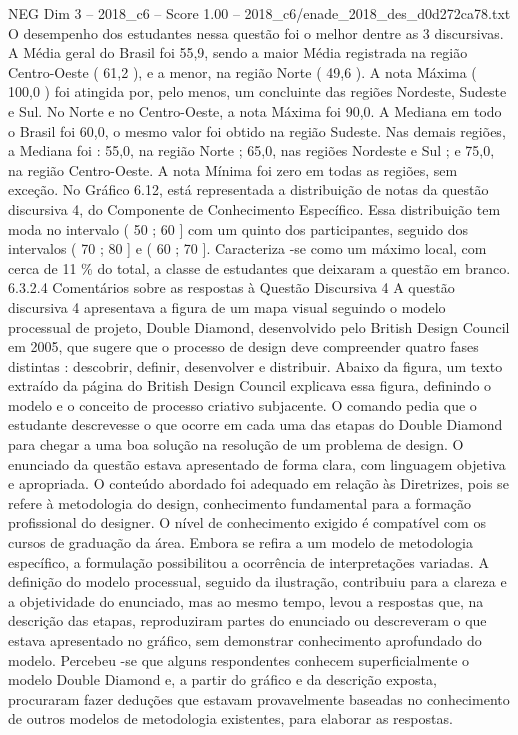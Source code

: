\begin{textsample}{NEG Dim 3 – 2018\_c6 – Score 1.00 – 2018\_c6/enade\_2018\_des\_d0d272ca78.txt}
O desempenho dos estudantes nessa questão foi o melhor dentre as 3 discursivas.
A Média geral do Brasil foi 55,9, sendo a maior Média registrada na região Centro-Oeste ( 61,2 ), e a menor, na região Norte ( 49,6 ).
A nota Máxima ( 100,0 ) foi atingida por, pelo menos, um concluinte das regiões Nordeste, Sudeste e Sul.
No Norte e no Centro-Oeste, a nota Máxima foi 90,0.
A Mediana em todo o Brasil foi 60,0, o mesmo valor foi obtido na região Sudeste.
Nas demais regiões, a Mediana foi : 55,0, na região Norte ; 65,0, nas regiões Nordeste e Sul ; e 75,0, na região Centro-Oeste.
A nota Mínima foi zero em todas as regiões, sem exceção.
No Gráfico 6.12, está representada a distribuição de notas da questão discursiva 4, do Componente de Conhecimento Específico.
Essa distribuição tem moda no intervalo ( 50 ; 60 ] com um quinto dos participantes, seguido dos intervalos ( 70 ; 80 ] e ( 60 ; 70 ].
Caracteriza -se como um máximo local, com cerca de 11 \% do total, a classe de estudantes que deixaram a questão em branco. 6.3.2.4 Comentários sobre as respostas à Questão Discursiva 4 A questão discursiva 4 apresentava a figura de um mapa visual seguindo o modelo processual de projeto, Double Diamond, desenvolvido pelo British Design Council em 2005, que sugere que o processo de design deve compreender quatro fases distintas : descobrir, definir, desenvolver e distribuir.
Abaixo da figura, um texto extraído da página do British Design Council explicava essa figura, definindo o modelo e o conceito de processo criativo subjacente.
O comando pedia que o estudante descrevesse o que ocorre em cada uma das etapas do Double Diamond para chegar a uma boa solução na resolução de um problema de design.
O enunciado da questão estava apresentado de forma clara, com linguagem objetiva e apropriada.
O conteúdo abordado foi adequado em relação às Diretrizes, pois se refere à metodologia do design, conhecimento fundamental para a formação profissional do designer.
O nível de conhecimento exigido é compatível com os cursos de graduação da área.
Embora se refira a um modelo de metodologia específico, a formulação possibilitou a ocorrência de interpretações variadas.
A definição do modelo processual, seguido da ilustração, contribuiu para a clareza e a objetividade do enunciado, mas ao mesmo tempo, levou a respostas que, na descrição das etapas, reproduziram partes do enunciado ou descreveram o que estava apresentado no gráfico, sem demonstrar conhecimento aprofundado do modelo.
Percebeu -se que alguns respondentes conhecem superficialmente o modelo Double Diamond e, a partir do gráfico e da descrição exposta, procuraram fazer deduções que estavam provavelmente baseadas no conhecimento de outros modelos de metodologia existentes, para elaborar as respostas.

\end{textsample}

